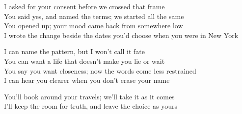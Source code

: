 \begin{lyrics}
I asked for your consent before we crossed that frame\\
You said yes, and named the terms; we started all the same\\
You opened up; your mood came back from somewhere low\\
I wrote the change beside the dates you’d choose when you were in New York

I can name the pattern, but I won’t call it fate\\
You can want a life that doesn’t make you lie or wait\\
You say you want closeness; now the words come less restrained\\
I can hear you clearer when you don’t erase your name

You’ll book around your travels; we’ll take it as it comes\\
I’ll keep the room for truth, and leave the choice as yours
\end{lyrics}

